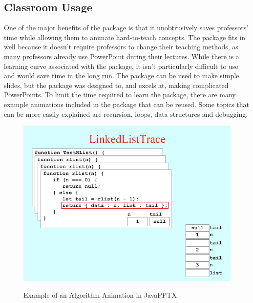 \documentclass[12pt,twoside]{reedthesis}
\begin{document}
\subsection{Classroom Usage}
One of the major benefits of the package is that it unobtrusively saves professors' time while allowing them to animate hard-to-teach concepts.  The package fits in well because it doesn't require professors to change their teaching methods, as many professors already use PowerPoint during their lectures. While there is a learning curve associated with the package, it isn't particularly difficult to use and would save time in the long run. The package can be used to make simple slides, but the package was designed to, and excels at, making complicated PowerPoints. To limit the time required to learn the package, there are many example animations included in the package that can be reused. Some topics that can be more easily explained are recursion, loops, data structures and debugging. 
\begin{figure}[htbp] 
\begin{centering} 
\caption{Example of an Algorithm Animation in JavaPPTX} 
\includegraphics{algoanim} 
\label{subd}
\end{centering} 
\end{figure}
	
\end{document}
